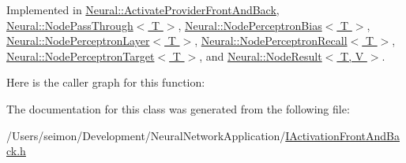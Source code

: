 Implemented in \hyperlink{class_neural_1_1_activate_provider_front_and_back_a5da39bdcc01ca52cc74fbc2ad6a07fe1}{Neural::ActivateProviderFrontAndBack}, \hyperlink{class_neural_1_1_node_pass_through_a9456e17114a41371c8c111ae1ba88b01}{Neural::NodePassThrough$<$ T $>$}, \hyperlink{class_neural_1_1_node_perceptron_bias_abe8e6d1a10620e56bc41318581b50375}{Neural::NodePerceptronBias$<$ T $>$}, \hyperlink{class_neural_1_1_node_perceptron_layer_aa10fa97cf43ca754f12328601fb2d2f6}{Neural::NodePerceptronLayer$<$ T $>$}, \hyperlink{class_neural_1_1_node_perceptron_recall_aba78057a00733c9256e70e92ed6c8cec}{Neural::NodePerceptronRecall$<$ T $>$}, \hyperlink{class_neural_1_1_node_perceptron_target_a64d68059836b16229a14c7ed4028c084}{Neural::NodePerceptronTarget$<$ T $>$}, and \hyperlink{class_neural_1_1_node_result_a15262168019626591b80dbb9136bc129}{Neural::NodeResult$<$ T, V $>$}.



Here is the caller graph for this function:




The documentation for this class was generated from the following file:\begin{DoxyCompactItemize}
\item 
/Users/seimon/Development/NeuralNetworkApplication/\hyperlink{_i_activation_front_and_back_8h}{IActivationFrontAndBack.h}\end{DoxyCompactItemize}
